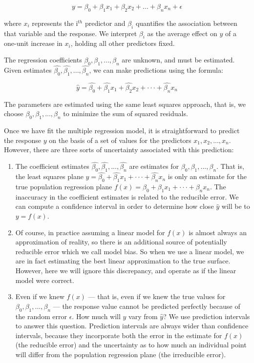 \begin{equation}
    y = \beta_0 + \beta_1 x_1 + \beta_2 x_2 + ... + \beta_n x_n + \epsilon
\end{equation}

where $x_i$ represents the i$^{th}$ predictor and $\beta_i$ quantifies the association between that
variable and the response. We interpret $\beta_i$ as the average effect on $y$ of a one-unit
increase in $x_i$, holding all other predictors fixed.

The regression coefficients $\beta_0, \beta_1, ..., \beta_n$ are unknown, and must be estimated.
Given estimates $\hat{\beta_0}, \hat{\beta_1}, ..., \hat{\beta_n}$, we can make predictions using
the formula:

\begin{equation}
    \hat{y} = \hat{\beta_0} + \hat{\beta_1} x_1 + \hat{\beta_2} x_2 + ··· + \hat{\beta_n} x_n
\end{equation}

The parameters are estimated using the same least squares approach, that is, we choose $\beta_0,
\beta_1, ..., \beta_n$ to minimize the sum of squared residuals.

Once we have fit the multiple regression model, it is straightforward to predict the response $y$ on
the basis of a set of values for the predictors $x_1, x_2, ..., x_n$. However, there are three sorts
of uncertainty associated with this prediction:

\begin{enumerate}
    \item The coefficient estimates $\hat{\beta_0}, \hat{\beta_1}, ..., \hat{\beta_n}$ are estimates
for $\beta_0, \beta_1, ..., \beta_n$. That is, the least squares plane $\hat{y} = \hat{\beta_0} +
\hat{\beta_1} x_1 + ··· + \hat{\beta_n} x_n$ is only an estimate for the true population regression
plane $f(x) = \beta_0 + \beta_1 x_1 + ··· + \beta_n x_n$. The inaccuracy in the coefficient
estimates is related to the reducible error. We can compute a confidence interval in order to
determine how close $\hat{y}$ will be to $y = f(x)$.

    \item Of course, in practice assuming a linear model for $f(x)$ is almost always an
approximation of reality, so there is an additional source of potentially reducible error which we
call model bias. So when we use a linear model, we are in fact estimating the best linear
approximation to the true surface. However, here we will ignore this discrepancy, and operate as if
the linear model were correct.

    \item Even if we knew $f(x)$ --- that is, even if we knew the true values for $\beta_0, \beta_1,
..., \beta_n$ --- the response value cannot be predicted perfectly because of the random error
$\epsilon$. How much will $y$ vary from $\hat{y}$? We use prediction intervals to answer this
question. Prediction intervals are always wider than confidence intervals, because they incorporate
both the error in the estimate for $f(x)$ (the reducible error) and the uncertainty as to how much
an individual point will differ from the population regression plane (the irreducible error).
\end{enumerate}


